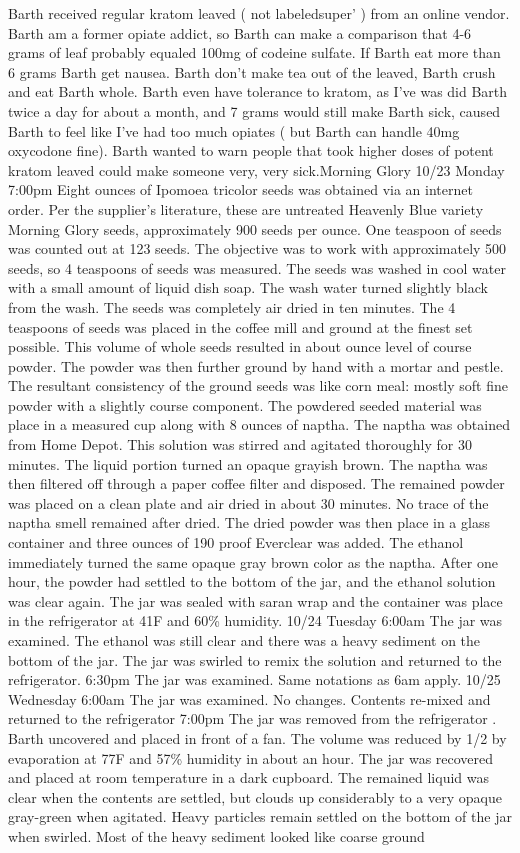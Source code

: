 \documentclass[12pt]{book}
\begin{document}
Barth received regular kratom leaved ( not labeledsuper' ) from an online vendor. Barth am a former opiate addict, so Barth can make a comparison that 4-6 grams of leaf probably equaled 100mg of codeine sulfate. If Barth eat more than 6 grams Barth get nausea. Barth don't make tea out of the leaved, Barth crush and eat Barth whole. Barth even have tolerance to kratom, as I've was did Barth twice a day for about a month, and 7 grams would still make Barth sick, caused Barth to feel like I've had too much opiates ( but Barth can handle 40mg oxycodone fine). Barth wanted to warn people that took higher doses of potent kratom leaved could make someone very, very sick.Morning Glory 10/23 Monday 7:00pm Eight ounces of Ipomoea tricolor seeds was obtained via an internet order. Per the supplier's literature, these are untreated Heavenly Blue variety Morning Glory seeds, approximately 900 seeds per ounce. One teaspoon of seeds was counted out at 123 seeds. The objective was to work with approximately 500 seeds, so 4 teaspoons of seeds was measured. The seeds was washed in cool water with a small amount of liquid dish soap. The wash water turned slightly black from the wash. The seeds was completely air dried in ten minutes. The 4 teaspoons of seeds was placed in the coffee mill and ground at the finest set possible. This volume of whole seeds resulted in about ounce level of course powder. The powder was then further ground by hand with a mortar and pestle. The resultant consistency of the ground seeds was like corn meal: mostly soft fine powder with a slightly course component. The powdered seeded material was place in a measured cup along with 8 ounces of naptha. The naptha was obtained from Home Depot. This solution was stirred and agitated thoroughly for 30 minutes. The liquid portion turned an opaque grayish brown. The naptha was then filtered off through a paper coffee filter and disposed. The remained powder was placed on a clean plate and air dried in about 30 minutes. No trace of the naptha smell remained after dried. The dried powder was then place in a glass container and three ounces of 190 proof Everclear was added. The ethanol immediately turned the same opaque gray brown color as the naptha. After one hour, the powder had settled to the bottom of the jar, and the ethanol solution was clear again. The jar was sealed with saran wrap and the container was place in the refrigerator at 41F and 60\% humidity. 10/24 Tuesday 6:00am The jar was examined. The ethanol was still clear and there was a heavy sediment on the bottom of the jar. The jar was swirled to remix the solution and returned to the refrigerator. 6:30pm The jar was examined. Same notations as 6am apply. 10/25 Wednesday 6:00am The jar was examined. No changes. Contents re-mixed and returned to the refrigerator 7:00pm The jar was removed from the refrigerator . Barth uncovered and placed in front of a fan. The volume was reduced by 1/2 by evaporation at 77F and 57\% humidity in about an hour. The jar was recovered and placed at room temperature in a dark cupboard. The remained liquid was clear when the contents are settled, but clouds up considerably to a very opaque gray-green when agitated. Heavy particles remain settled on the bottom of the jar when swirled. Most of the heavy sediment looked like coarse ground 
\end{document}
